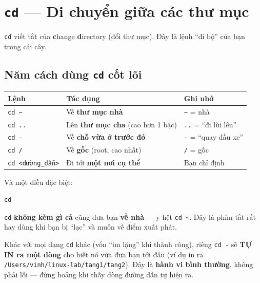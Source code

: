 \documentclass[12pt,a4paper]{article}
\newcommand{\hm}{\textasciitilde{}}
\begin{document}
\section{\texttt{cd} --- Di chuyển giữa các thư mục}

\texttt{cd} viết tắt của \textbf{c}hange \textbf{d}irectory (đổi thư mục). Đây là lệnh ``đi bộ'' của bạn trong cái cây.

\subsection{Năm cách dùng \texttt{cd} cốt lõi}

\renewcommand{\arraystretch}{1.4}
\begin{longtable}{>{\raggedright\arraybackslash}p{3.4cm} >{\raggedright\arraybackslash}p{6.5cm} >{\raggedright\arraybackslash}p{3.4cm}}
\rowcolor{checkback}
\textbf{Lệnh} & \textbf{Tác dụng} & \textbf{Ghi nhớ} \\
\hline
\endhead
\texttt{cd \hm} & Về \textbf{thư mục nhà} & \texttt{\hm} = nhà \\
\texttt{cd ..} & Lên \textbf{thư mục cha} (cao hơn 1 bậc) & \texttt{..} = ``đi lùi lên'' \\
\texttt{cd -} & Về \textbf{chỗ vừa ở trước đó} & \texttt{-} = ``quay đầu xe'' \\
\texttt{cd /} & Về \textbf{gốc} (root, cao nhất) & \texttt{/} = gốc \\
\texttt{cd <đường\_dẫn>} & Đi tới \textbf{một nơi cụ thể} & Bạn chỉ định \\
\end{longtable}
\renewcommand{\arraystretch}{1}

Và một điều đặc biệt:

\begin{codebox}
\begin{verbatim}
cd
\end{verbatim}
\end{codebox}

\texttt{cd} \textbf{không kèm gì cả} cũng đưa bạn \textbf{về nhà} --- y hệt \texttt{cd \hm}. Đây là phím tắt rất hay dùng khi bạn bị ``lạc'' và muốn về điểm xuất phát.

\begin{notebox}[title={Lưu ý quan trọng về \texttt{cd -}}]
Khác với mọi dạng \texttt{cd} khác (vốn ``im lặng'' khi thành công), riêng \texttt{cd -} sẽ \textbf{TỰ IN ra một dòng} cho biết nó vừa đưa bạn tới đâu (ví dụ in ra \texttt{/Users/vinh/linux-lab/tang1/tang2}). Đây là \textbf{hành vi bình thường}, không phải lỗi --- đừng hoảng khi thấy dòng đường dẫn tự hiện ra.
\end{notebox}
\end{document}
